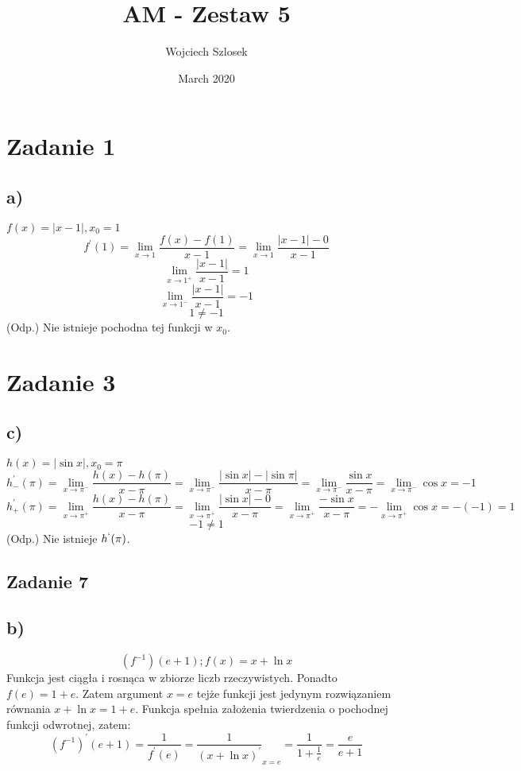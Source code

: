 \documentclass{article}
\title{AM - Zestaw 5}
\author{Wojciech Szlosek}
\date{March 2020}
\begin{document}
\maketitle

\section{Zadanie 1}

\subsection{a)}

$f(x) = |x-1|, x_{0} = 1$
$$f^{'}(1) = \lim_{x \to 1} \frac{f(x)-f(1)}{x-1} = \lim_{x \to 1} \frac{|x-1|-0}{x-1}$$
$$\lim_{x \to 1^{+}}\frac{|x-1|}{x-1}=1$$
$$\lim_{x \to 1^{-}}\frac{|x-1|}{x-1}=-1$$
$$1 \neq -1$$
(Odp.) Nie istnieje pochodna tej funkcji w $x_{0}$.

\section{Zadanie 3}

\subsection{c)}

$h(x) = |\sin{x}|, x_{0} = \pi$
$$h^{'}_{-}(\pi) = \lim_{x \to \pi^{-}}\frac{h(x)-h(\pi)}{x-\pi} = \lim_{x \to \pi^{-}}\frac{|\sin{x}|-|\sin{\pi}|}{x-\pi} = \lim_{x \to \pi^{-}}\frac{\sin{x}}{x-\pi} = \lim_{x \to \pi^{-}}\cos{x} = -1$$
$$h^{'}_{+}(\pi) = \lim_{x \to \pi^{+}}\frac{h(x)-h(\pi)}{x-\pi} = \lim_{x \to \pi^{+}}\frac{|\sin{x}|-0}{x-\pi} = \lim_{x \to \pi^{+}}\frac{-\sin{x}}{x-\pi} = -\lim_{x \to \pi^{+}}\cos{x} = -(-1) = 1$$
$$-1 \neq 1$$
(Odp.) Nie istnieje $h^{`}(\pi)$.

\subsection{Zadanie 7}

\subsection{b)}
$$(f^{-1})(e+1); f(x) = x + \ln{x}$$
Funkcja jest ciągła i rosnąca w zbiorze liczb rzeczywistych. Ponadto $f(e) = 1 + e$. Zatem argument $x = e$ tejże funkcji jest jedynym rozwiązaniem równania $x + \ln{x} = 1 + e$. Funkcja spełnia założenia twierdzenia o pochodnej funkcji odwrotnej, zatem: \newline
$$(f^{-1})^{'}(e+1) = \frac{1}{f^{'}(e)} = \frac{1}{(x+\ln{x})^{'}}_{x=e} = \frac{1}{1+\frac{1}{e}} = \frac{e}{e+1}$$
\end{document}
